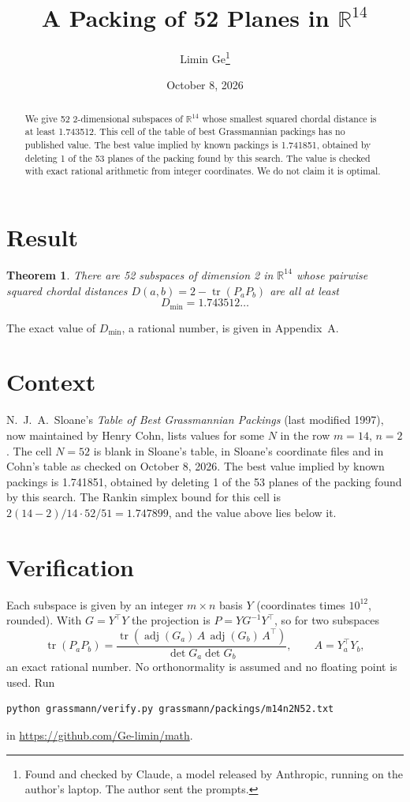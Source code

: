 \documentclass[11pt,a4paper]{article}
\title{A Packing of 52 Planes in $\mathbb{R}^{14}$}
\author{Limin Ge\thanks{Found and checked by Claude, a model released by Anthropic, running on the author's laptop. The author sent the prompts.}}
\date{October 8, 2026}
\newtheorem*{theorem}{Theorem}
\begin{document}
\maketitle
\begin{abstract}
We give 52 2-dimensional subspaces of $\mathbb{R}^{14}$ whose smallest squared chordal distance is at least 1.743512. This cell of the table of best Grassmannian packings has no published value. The best value implied by known packings is 1.741851, obtained by deleting 1 of the 53 planes of the packing found by this search. The value is checked with exact rational arithmetic from integer coordinates. We do not claim it is optimal.
\end{abstract}

\section{Result}
\begin{theorem}
There are 52 subspaces of dimension 2 in $\mathbb{R}^{14}$ whose pairwise squared chordal distances $D(a,b) = 2 - \operatorname{tr}(P_aP_b)$ are all at least
\[ D_{\min} = 1.743512\ldots \]
\end{theorem}
The exact value of $D_{\min}$, a rational number, is given in Appendix~A.


\section{Context}
N.~J.~A.~Sloane's \emph{Table of Best Grassmannian Packings} (last modified 1997), now maintained by Henry Cohn, lists values for some $N$ in the row $m=14$, $n=2$. The cell $N=52$ is blank in Sloane's table, in Sloane's coordinate files and in Cohn's table as checked on October 8, 2026. The best value implied by known packings is 1.741851, obtained by deleting 1 of the 53 planes of the packing found by this search. The Rankin simplex bound for this cell is $2(14-2)/14\cdot 52/51 = 1.747899$, and the value above lies below it.


\section{Verification}
Each subspace is given by an integer $m\times n$ basis $Y$ (coordinates times $10^{12}$, rounded). With $G=Y^\top Y$ the projection is $P=YG^{-1}Y^\top$, so for two subspaces
\[ \operatorname{tr}(P_aP_b)=\frac{\operatorname{tr}(\operatorname{adj}(G_a)\,A\,\operatorname{adj}(G_b)\,A^\top)}{\det G_a\det G_b},\qquad A=Y_a^\top Y_b, \]
an exact rational number. No orthonormality is assumed and no floating point is used. Run
\begin{verbatim}
python grassmann/verify.py grassmann/packings/m14n2N52.txt
\end{verbatim}
in \url{https://github.com/Ge-limin/math}.
\end{document}
